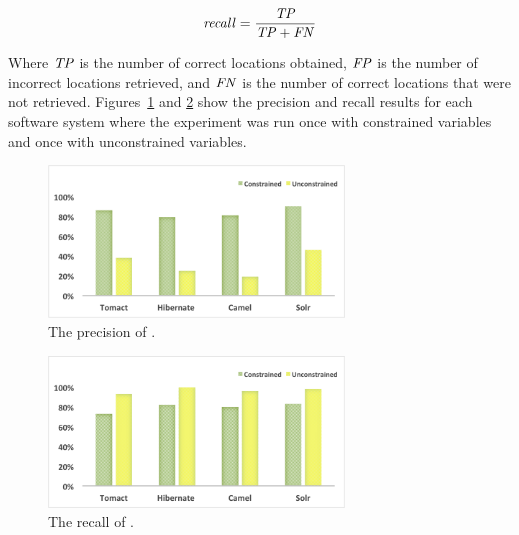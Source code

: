 \begin{equation}\label{recall_eq}
\mathit{recall} = \frac{\mathit{TP}}{{\mathit{TP}+\mathit{FN}}}
\end{equation}


Where $\mathit{TP}$ is the number of correct locations obtained, $\mathit{FP}$ is the number of incorrect locations retrieved, and $\mathit{FN}$ is the number of correct locations that were not retrieved. Figures~\ref{fig:precision} and \ref{fig:recall} show the precision and recall results for each software system where the experiment was run once with constrained variables and once with unconstrained variables.


\begin{figure} [H]
  \centering\includegraphics [width = 0.7\textwidth, height = 0.3\textheight]{Charts/Precision.png}
  \caption{The precision of .}
  \label{fig:precision}
\end{figure}

\begin{figure} [H]
  \centering\includegraphics [width = 0.7\textwidth, height = 0.3\textheight]{Charts/Recall.png}
  \caption{The recall of .}
  \label{fig:recall}
\end{figure}

